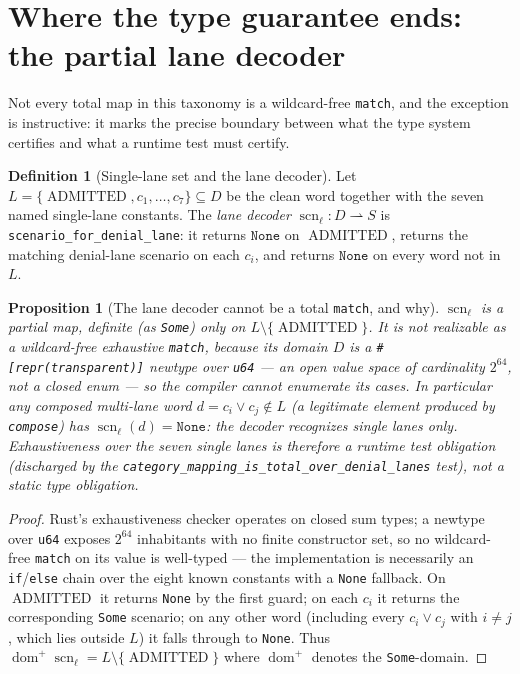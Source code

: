 \documentclass[11pt,oneside]{book}
\theoremstyle{definition}
\newtheorem{definition}{Definition}[chapter]
\theoremstyle{plain}
\newtheorem{proposition}[theorem]{Proposition}
\theoremstyle{remark}
\DeclareMathOperator{\dom}{dom}
\newcommand{\code}[1]{\texttt{#1}}
\newcommand{\Deny}{D}                 %
\newcommand{\Adml}{\operatorname{ADMITTED}}          %
\newcommand{\Scnset}{S}              %
\DeclareMathOperator{\scnop}{scn}
\begin{document}
\section{Where the type guarantee ends: the partial lane decoder}

Not every total map in this taxonomy is a wildcard-free \code{match}, and the exception is instructive: it marks the precise boundary between what the type system certifies and what a runtime test must certify. %

\begin{definition}[Single-lane set and the lane decoder]\label{def:decoder}
Let $L=\{\Adml,c_1,\dots,c_7\}\subseteq\Deny$ be the clean word together with the seven named single-lane constants. %
The \emph{lane decoder} $\scnop_\ell:\Deny\rightharpoonup\Scnset$ is \code{scenario\_for\_denial\_lane}: it returns $\code{None}$ on $\Adml$, returns the matching denial-lane scenario on each $c_i$, and returns $\code{None}$ on every word not in $L$. %
\end{definition}

\begin{proposition}[The lane decoder cannot be a total \texttt{match}, and why]\label{prop:partial}
$\scnop_\ell$ is a partial map, definite (as \code{Some}) only on $L\setminus\{\Adml\}$. %
It is \emph{not} realizable as a wildcard-free exhaustive \code{match}, because its domain $\Deny$ is a \code{\#[repr(transparent)]} newtype over \code{u64} --- an open value space of cardinality $2^{64}$, not a closed enum --- so the compiler cannot enumerate its cases. %
In particular any composed multi-lane word $d=c_i\lor c_j\notin L$ (a legitimate element produced by \code{compose}) has $\scnop_\ell(d)=\code{None}$: the decoder recognizes single lanes only. %
Exhaustiveness over the seven single lanes is therefore a \emph{runtime test obligation} (discharged by the \code{category\_mapping\_is\_total\_over\_denial\_lanes} test), not a static type obligation. %
\end{proposition}

\begin{proof}
Rust's exhaustiveness checker operates on closed sum types; a newtype over \code{u64} exposes $2^{64}$ inhabitants with no finite constructor set, so no wildcard-free \code{match} on its value is well-typed --- the implementation is necessarily an \code{if}/\code{else} chain over the eight known constants with a \code{None} fallback. %
On $\Adml$ it returns \code{None} by the first guard; on each $c_i$ it returns the corresponding \code{Some} scenario; on any other word (including every $c_i\lor c_j$ with $i\ne j$, which lies outside $L$) it falls through to \code{None}. %
Thus $\dom^{+}\scnop_\ell=L\setminus\{\Adml\}$ where $\dom^{+}$ denotes the \code{Some}-domain. %
\end{proof}
\end{document}
